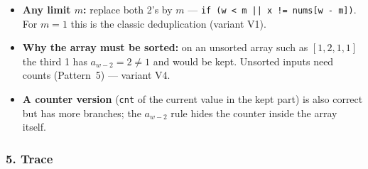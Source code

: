 \begin{tricksbox}
\begin{itemize}[leftmargin=*]
    \item \textbf{Any limit $m$:} replace both 2's by $m$ --- \texttt{if (w < m || x != nums[w - m])}. For $m = 1$ this is the classic deduplication (variant V1).
    \item \textbf{Why the array must be sorted:} on an unsorted array such as $[1, 2, 1, 1]$ the third 1 has $a_{w-2} = 2 \ne 1$ and would be kept. Unsorted inputs need counts (Pattern~5) --- variant V4.
    \item \textbf{A counter version} (\texttt{cnt} of the current value in the kept part) is also correct but has more branches; the $a_{w-2}$ rule hides the counter inside the array itself.
\end{itemize}
\end{tricksbox}

\subsubsection*{5. Trace}


